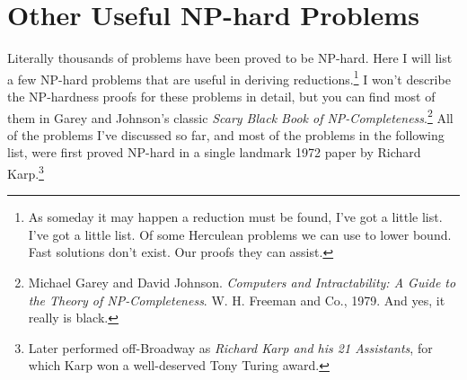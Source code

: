 \section{Other Useful NP-hard Problems}
\label{sec:12.13}

Literally thousands of problems have been proved to be NP-hard.
Here I will list a few NP-hard problems that are useful in deriving reductions.\footnote{As someday it may happen a reduction must be found, I’ve got a little list. I’ve got a little list. Of some Herculean problems we can use to lower bound. Fast solutions don’t exist. Our proofs they can assist.}
I won’t describe the NP-hardness proofs for these problems in detail, but you can find most of them in Garey and Johnson’s classic \textit{Scary Black Book of NP-Completeness}.\footnote{Michael Garey and David Johnson. \textit{Computers and Intractability: A Guide to the Theory of NP-Completeness}. W. H. Freeman and Co., 1979. And yes, it really is black.}
All of the problems I’ve discussed so far, and most of the problems in the following list, were first proved NP-hard in a single landmark 1972 paper by Richard Karp.\footnote{Later performed off-Broadway as \textit{Richard Karp and his 21 Assistants}, for which Karp won a well-deserved Tony Turing award.}
